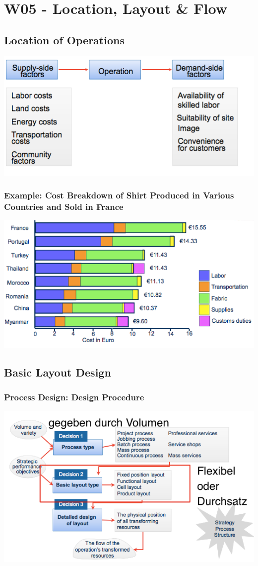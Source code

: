 \section{W05 - Location, Layout \& Flow}
\subsection{Location of Operations}
\includegraphics[width=1\textwidth]{W05/locationofoperations}
\subsubsection{Example: Cost Breakdown of Shirt Produced in Various Countries and Sold in France}
\includegraphics[width=1\textwidth]{W05/transportcost}
\subsection{Basic Layout Design}
\subsubsection{Process Design: Design Procedure}
\includegraphics[width=1\textwidth]{W05/designrocess}

